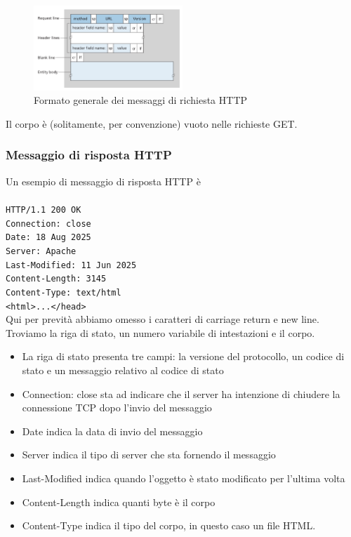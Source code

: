 \documentclass{book}
\begin{document}
\begin{figure}[h]
	\centering
	\includegraphics[width=0.5\textwidth]{images/http_request_message.png}
	\caption{Formato generale dei messaggi di richiesta HTTP}
	\label{fig:esempio}
\end{figure}

Il corpo è (solitamente, per convenzione) vuoto nelle richieste GET.

\subsubsection*{Messaggio di risposta HTTP}
Un esempio di messaggio di risposta HTTP è
\\\\
\texttt{HTTP/1.1 200 OK}\\
\texttt{Connection: close}\\
\texttt{Date: 18 Aug 2025}\\
\texttt{Server: Apache}\\
\texttt{Last-Modified: 11 Jun 2025}\\
\texttt{Content-Length: 3145}\\
\texttt{Content-Type: text/html}\\
\texttt{<html>...</head>}\\

Qui per prevità abbiamo omesso i caratteri di carriage return e new line. Troviamo la riga di stato, un numero variabile di intestazioni e il corpo.

\begin{itemize}
	\item La riga di stato presenta tre campi: la versione del protocollo, un codice di stato e un messaggio relativo al codice di stato
	\item Connection: close sta ad indicare che il server ha intenzione di chiudere la connessione TCP dopo l'invio del messaggio
	\item Date indica la data di invio del messaggio
	\item Server indica il tipo di server che sta fornendo il messaggio
	\item Last-Modified indica quando l'oggetto è stato modificato per l'ultima volta
	\item Content-Length indica quanti byte è il corpo
	\item Content-Type indica il tipo del corpo, in questo caso un file HTML.
\end{itemize}
\end{document}

